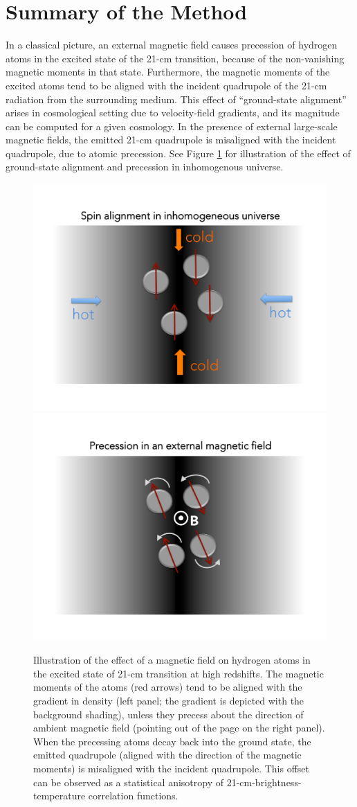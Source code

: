 \section{Summary of the Method}
\label{sec:method}

In a classical picture, an external magnetic field causes precession of hydrogen atoms in the excited state of the 21-cm transition, because of the non-vanishing magnetic moments in that state.  Furthermore, the magnetic moments of the excited atoms tend to be aligned with the incident quadrupole of the 21-cm radiation from the surrounding medium. This effect of ``ground-state alignment'' arises in cosmological setting due to velocity-field gradients, and its magnitude can be computed for a given cosmology. In the presence of external large-scale magnetic fields, the emitted 21-cm quadrupole is misaligned with the incident quadrupole, due to atomic precession. See Figure \ref{fig:precession} for illustration of the effect of ground-state alignment and precession in inhomogenous universe. 
\begin{figure}
\centering
\includegraphics[width=.35\textwidth,keepaspectratio=true]{Slide2.pdf}
\includegraphics[width=.35\textwidth,keepaspectratio=true]{Slide3.pdf}
\caption{Illustration of the effect of a magnetic field on hydrogen atoms in the excited state of 21-cm transition at high redshifts. The magnetic moments of the atoms (red arrows) tend to be aligned with the gradient in density (left panel; the gradient is depicted with the background shading), unless they precess about the direction of ambient magnetic field (pointing out of the page on the right panel). When the precessing atoms decay back into the ground state, the emitted quadrupole (aligned with the direction of the magnetic moments) is misaligned with the incident quadrupole. This offset can be observed as a statistical anisotropy of 21-cm-brightness-temperature correlation functions.\label{fig:precession}}
\end{figure}

